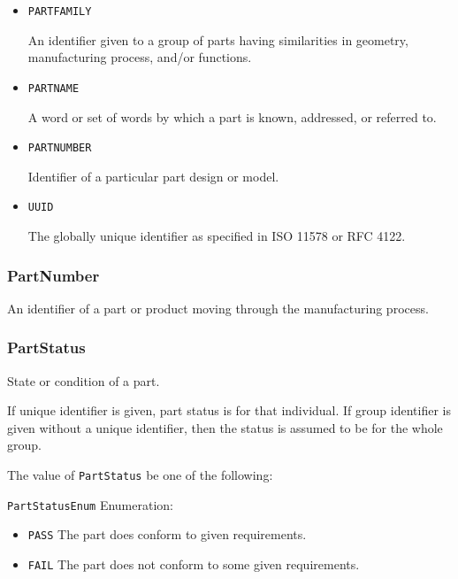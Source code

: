 \begin{itemize}

\item \texttt{PART\textunderscore FAMILY}


An identifier given to a group of parts having similarities in geometry, manufacturing process, and/or functions.

\item \texttt{PART\textunderscore NAME}


A word or set of words by which a part is known, addressed, or referred to.

\item \texttt{PART\textunderscore NUMBER}


Identifier of a particular part design or model.

\item \texttt{UUID}


The globally unique identifier as specified in ISO 11578 or RFC 4122.


\end{itemize}







\subsubsection{PartNumber}
\label{sec:PartNumber}



An identifier of a part or product moving through the manufacturing process. 



\subsubsection{PartStatus}
\label{sec:PartStatus}



State or condition of a part.

If unique identifier is given, part status is for that individual. If group identifier is given without a unique identifier, then the status is assumed to be for the whole group.


The value of \texttt{PartStatus} \MUST be one of the following: 


\texttt{PartStatusEnum} Enumeration:

\begin{itemize}
\item \texttt{PASS} \newline The part does conform to given requirements. 
\item \texttt{FAIL} \newline The part does not conform to some given requirements. 
\end{itemize}




